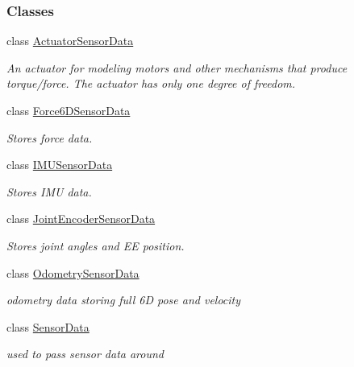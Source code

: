 \subsubsection*{Classes}
\begin{DoxyCompactItemize}
\item 
class \hyperlink{classOpenRAVE_1_1SensorBase_1_1ActuatorSensorData}{ActuatorSensorData}
\begin{DoxyCompactList}\small\item\em An actuator for modeling motors and other mechanisms that produce torque/force. The actuator has only one degree of freedom. \item\end{DoxyCompactList}\item 
class \hyperlink{classOpenRAVE_1_1SensorBase_1_1Force6DSensorData}{Force6DSensorData}
\begin{DoxyCompactList}\small\item\em Stores force data. \item\end{DoxyCompactList}\item 
class \hyperlink{classOpenRAVE_1_1SensorBase_1_1IMUSensorData}{IMUSensorData}
\begin{DoxyCompactList}\small\item\em Stores IMU data. \item\end{DoxyCompactList}\item 
class \hyperlink{classOpenRAVE_1_1SensorBase_1_1JointEncoderSensorData}{JointEncoderSensorData}
\begin{DoxyCompactList}\small\item\em Stores joint angles and EE position. \item\end{DoxyCompactList}\item 
class \hyperlink{classOpenRAVE_1_1SensorBase_1_1OdometrySensorData}{OdometrySensorData}
\begin{DoxyCompactList}\small\item\em odometry data storing full 6D pose and velocity \item\end{DoxyCompactList}\item 
class \hyperlink{classOpenRAVE_1_1SensorBase_1_1SensorData}{SensorData}
\begin{DoxyCompactList}\small\item\em used to pass sensor data around \item\end{DoxyCompactList}\item 

\end{DoxyCompactItemize}
